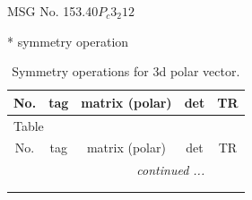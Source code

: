 \documentclass[fleqn,8pt]{jsarticle}
\begin{document}
\setcounter{MaxMatrixCols}{32}

\renewcommand{\tablename}{Table~}
\renewcommand{\figurename}{Figure~}
\begin{center}
\LARGE
MSG No. 153.40\quad$P_{c}3_{2}12$
\end{center}
* symmetry operation
\renewcommand{\arraystretch}{1.3}
\begin{longtable}{ccccc}
\caption{Symmetry operations for 3d polar vector.}
 \\
 \hline \hline
No. & tag & matrix (polar) & det & TR \\ \hline \endfirsthead

\multicolumn{4}{l}{\tablename\ \thetable{}} \\
 \hline \hline
No. & tag & matrix (polar) & det & TR \\ \hline \endhead

 \hline \hline
\multicolumn{4}{r}{\footnotesize\it continued ...} \\ \endfoot

 \hline \hline
\multicolumn{4}{r}{} \\ \endlastfoot


\end{longtable}
\end{document}
